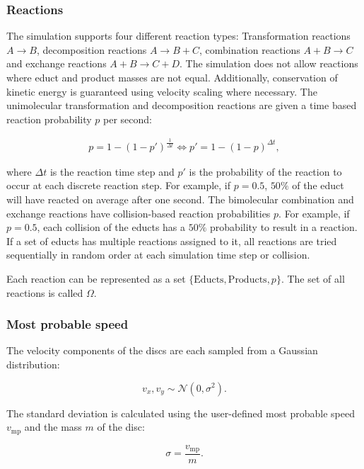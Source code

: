 \documentclass[a4paper]{scrartcl}
\begin{document}
\subsubsection*{Reactions}
The simulation supports four different reaction types: Transformation reactions $A\rightarrow B$, decomposition reactions $A \rightarrow B + C$, combination reactions $A+B \rightarrow C$ and exchange reactions $A+B \rightarrow C + D$. The simulation does not allow reactions where educt and product masses are not equal. Additionally, conservation of kinetic energy is guaranteed using velocity scaling where necessary. The unimolecular transformation and decomposition reactions are given a time based reaction probability $p$ per second:

\begin{align*}
    p = 1 - (1 - p')^{\frac{1}{\Delta t}} \Leftrightarrow p' = 1 - (1 - p)^{\Delta t},
\end{align*}

where $\Delta t$ is the reaction time step and $p'$ is the probability of the reaction to occur at each discrete reaction step. For example, if $p = 0.5$, $50\%$ of the educt will have reacted on average after one second. The bimolecular combination and exchange reactions have collision-based reaction probabilities $p$. For example, if $p = 0.5$, each collision of the educts has a $50\%$ probability to result in a reaction. If a set of educts has multiple reactions assigned to it, all reactions are tried sequentially in random order at each simulation time step or collision.

Each reaction can be represented as a set $\{\text{Educts}, \text{Products}, p\}$. The set of all reactions is called $\Omega$.

\subsubsection*{Most probable speed}
The velocity components of the discs are each sampled from a Gaussian distribution:

\begin{equation*}
    v_x, v_y \sim \mathcal{N}(0, \sigma^2).
\end{equation*}

The standard deviation is calculated using the user-defined most probable speed $v_{\text{mp}}$ and the mass $m$ of the disc:

\begin{equation*}
    \sigma = \frac{v_{\text{mp}}}{m}.
\end{equation*}
\end{document}
